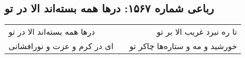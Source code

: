 \begin{center}
\section*{رباعی شماره ۱۵۶۷: درها همه بسته‌اند الا در تو}
\label{sec:1567}
\begin{longtable}{l p{0.5cm} r}
درها همه بسته‌اند الا در تو
&&
تا ره نبرد غریب الا بر تو
\\
ای در کرم و عزت و نورافشانی
&&
خورشید و مه و ستاره‌ها چاکر تو
\\
\end{longtable}
\end{center}
